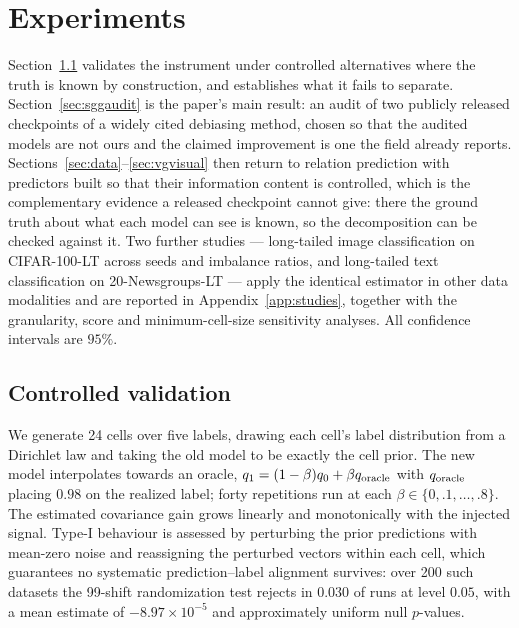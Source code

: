 \section{Experiments}\label{sec:exp}

Section~\ref{sec:simulation} validates the instrument under controlled alternatives where
the truth is known by construction, and establishes what it fails to separate.
Section~\ref{sec:sggaudit} is the paper's main result: an audit of two publicly released
checkpoints of a widely cited debiasing method, chosen so that the audited models are not
ours and the claimed improvement is one the field already reports.
Sections~\ref{sec:data}--\ref{sec:vgvisual} then return to relation prediction with
predictors built so that their information content is controlled, which is the
complementary evidence a released checkpoint cannot give: there the ground truth about what
each model can see is known, so the decomposition can be checked against it. Two further
studies --- long-tailed image classification on CIFAR-100-LT across seeds and imbalance
ratios, and long-tailed text classification on 20-Newsgroups-LT --- apply the identical
estimator in other data modalities and are reported in Appendix~\ref{app:studies}, together
with the granularity, score and minimum-cell-size sensitivity analyses. All confidence
intervals are $95\%$.

\subsection{Controlled validation}\label{sec:simulation}

We generate 24 cells over five labels, drawing each cell's label distribution from a
Dirichlet law and taking the old model to be exactly the cell prior. The new model
interpolates towards an oracle, $q_1=(1-\beta)q_0+\beta q_{\rm oracle}$ with $q_{\rm oracle}$
placing $0.98$ on the realized label; forty repetitions run at each
$\beta\in\{0,.1,\ldots,.8\}$. The estimated covariance gain grows linearly and monotonically
with the injected signal. Type-I behaviour is assessed by
perturbing the prior predictions with mean-zero noise and reassigning the perturbed vectors
within each cell, which guarantees no systematic prediction--label alignment survives: over
200 such datasets the 99-shift randomization test rejects in $0.030$ of runs at level $0.05$,
with a mean estimate of $-8.97\times10^{-5}$ and approximately uniform null $p$-values.

